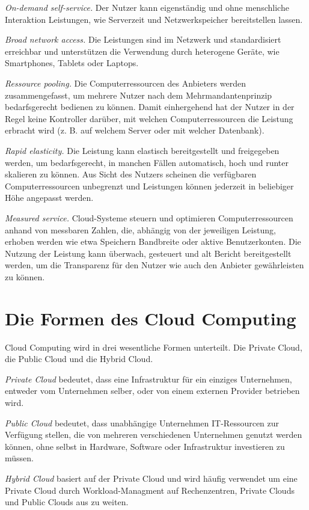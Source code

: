 \begin{description}
	\item \emph{On-demand self-service.} Der Nutzer kann eigenständig und ohne menschliche Interaktion Leistungen, wie Serverzeit und Netzwerkspeicher bereitstellen lassen.
	\item \emph{Broad network access.} Die Leistungen sind im Netzwerk und standardisiert erreichbar und unterstützen die Verwendung durch heterogene Geräte, wie Smartphones, Tablets oder Laptops.
	\item \emph{Ressource pooling.} Die Computerressourcen des Anbieters werden zusammengefasst, um mehrere Nutzer nach dem Mehrmandantenprinzip bedarfsgerecht bedienen zu können. Damit einhergehend hat der Nutzer in der Regel keine Kontroller darüber, mit welchen Computerressourcen die Leistung erbracht wird (z. B. auf welchem Server oder mit welcher Datenbank).
	\item \emph{Rapid elasticity.} Die Leistung kann elastisch bereitgestellt und freigegeben werden, um bedarfsgerecht, in manchen Fällen automatisch, hoch und runter skalieren zu können. Aus Sicht des Nutzers scheinen die verfügbaren Computerressourcen unbegrenzt und Leistungen können jederzeit in beliebiger Höhe angepasst werden.
	\item \emph{Measured service.} Cloud-Systeme steuern und optimieren Computerressourcen anhand von messbaren Zahlen, die, abhängig von der jeweiligen Leistung, erhoben werden wie etwa Speichern Bandbreite oder aktive Benutzerkonten. Die Nutzung der Leistung kann überwach, gesteuert und alt Bericht bereitgestellt werden, um die Transparenz für den Nutzer wie auch den Anbieter gewährleisten zu können.
\end{description}


\section{Die Formen des Cloud Computing} %
\label{sec:Die Formen des Cloud Computing}

Cloud Computing wird in drei wesentliche Formen unterteilt. Die Private Cloud, die Public Cloud und die Hybrid Cloud.
\begin{description}
	\item \emph{Private Cloud} bedeutet, dass eine Infrastruktur für ein einziges Unternehmen, entweder vom Unternehmen selber, oder von einem externen Provider betrieben wird.
	\item \emph{Public Cloud} bedeutet, dass unabhängige Unternehmen IT-Ressourcen zur Verfügung stellen, die von mehreren verschiedenen Unternehmen genutzt werden können, ohne selbst in Hardware, Software oder Infrastruktur investieren zu müssen.
	\item \emph{Hybrid Cloud} basiert auf der Private Cloud und wird häufig verwendet um eine Private Cloud durch Workload-Managment auf Rechenzentren, Private Clouds und Public Clouds aus zu weiten.
\end{description}

